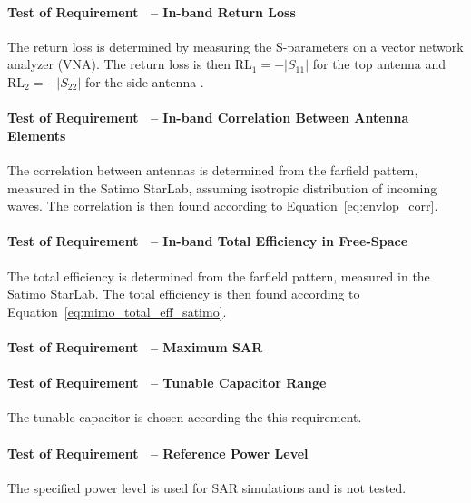 \paragraph{Test of Requirement~ -- In-band Return Loss}
The return loss is determined by measuring the S-parameters on a vector network analyzer (VNA). The return loss is then $\text{RL}_1 = -|S_{11}|$ for the top antenna and $\text{RL}_2 = -|S_{22}|$ for the side antenna \cite{pozar2011microwave}.

\paragraph{Test of Requirement~ -- In-band Correlation Between Antenna Elements}
The correlation between antennas is determined from the farfield pattern, measured in the Satimo StarLab, assuming isotropic distribution of incoming waves. The correlation is then found according to Equation~\ref{eq:envlop_corr}.

\paragraph{Test of Requirement~ -- In-band Total Efficiency in Free-Space}
The total efficiency is determined from the farfield pattern, measured in the Satimo StarLab.
The total efficiency is then found according to Equation~\ref{eq:mimo_total_eff_satimo}.

\paragraph{Test of Requirement~ -- Maximum SAR}

\paragraph{Test of Requirement~ -- Tunable Capacitor Range} 
The tunable capacitor is chosen according the this requirement.

\paragraph{Test of Requirement~ -- Reference Power Level}
The specified power level is used for SAR simulations and is not tested.


